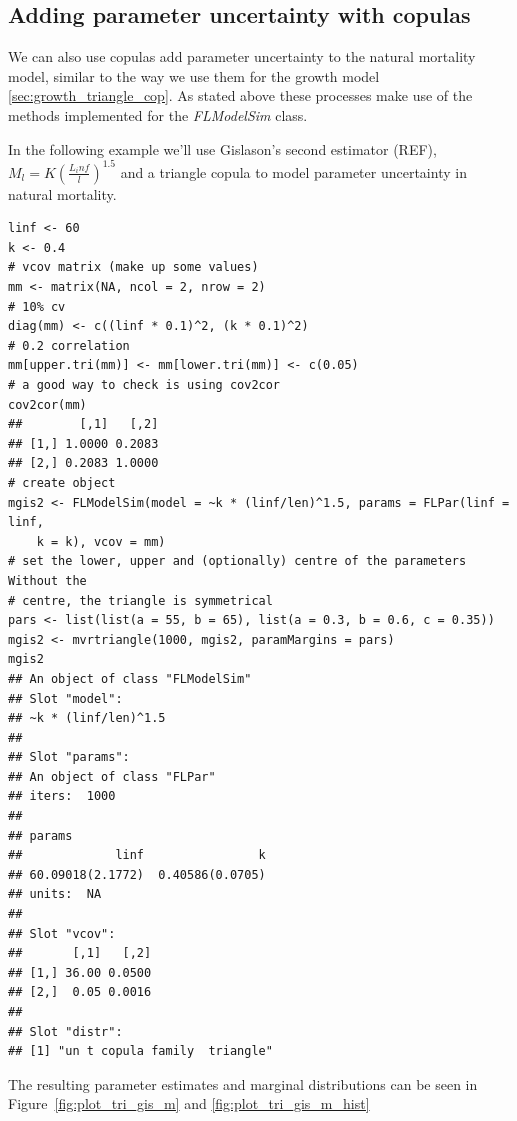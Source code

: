 \documentclass[a4paper,english,10pt]{article}\usepackage[]{graphicx}\usepackage[]{color}
\makeatletter
\newenvironment{kframe}{%
 \def\at@end@of@kframe{}%
 \ifinner\ifhmode%
  \def\at@end@of@kframe{\end{minipage}}%
  \begin{minipage}{\columnwidth}%
 \fi\fi%
 \def\FrameCommand##1{\hskip\@totalleftmargin \hskip-\fboxsep
 \colorbox{shadecolor}{##1}\hskip-\fboxsep
     \hskip-\linewidth \hskip-\@totalleftmargin \hskip\columnwidth}%
 \MakeFramed {\advance\hsize-\width
   \@totalleftmargin\z@ \linewidth\hsize
   \@setminipage}}%
 {\par\unskip\endMakeFramed%
 \at@end@of@kframe}
\newenvironment{knitrout}{}{} %
\newcommand{\class}[1]{{\textit{#1}}}
\makeatother
\begin{document}

\subsection{Adding parameter uncertainty with copulas}

We can also use copulas add parameter uncertainty to the natural mortality model, similar to the way we use them for the growth model \ref{sec:growth_triangle_cop}. As stated above these processes make use of the methods implemented for the \class{FLModelSim} class.


In the following example we'll use Gislason's second estimator (REF), $M_l=K(\frac{L_inf}{l})^1.5$ and a triangle copula to model parameter uncertainty in natural mortality.

\begin{knitrout}
\color{fgcolor}\begin{kframe}
\begin{verbatim}
linf <- 60
k <- 0.4
# vcov matrix (make up some values)
mm <- matrix(NA, ncol = 2, nrow = 2)
# 10% cv
diag(mm) <- c((linf * 0.1)^2, (k * 0.1)^2)
# 0.2 correlation
mm[upper.tri(mm)] <- mm[lower.tri(mm)] <- c(0.05)
# a good way to check is using cov2cor
cov2cor(mm)
##        [,1]   [,2]
## [1,] 1.0000 0.2083
## [2,] 0.2083 1.0000
# create object
mgis2 <- FLModelSim(model = ~k * (linf/len)^1.5, params = FLPar(linf = linf, 
    k = k), vcov = mm)
# set the lower, upper and (optionally) centre of the parameters Without the
# centre, the triangle is symmetrical
pars <- list(list(a = 55, b = 65), list(a = 0.3, b = 0.6, c = 0.35))
mgis2 <- mvrtriangle(1000, mgis2, paramMargins = pars)
mgis2
## An object of class "FLModelSim"
## Slot "model":
## ~k * (linf/len)^1.5
## 
## Slot "params":
## An object of class "FLPar"
## iters:  1000 
## 
## params
##             linf                k 
## 60.09018(2.1772)  0.40586(0.0705) 
## units:  NA 
## 
## Slot "vcov":
##       [,1]   [,2]
## [1,] 36.00 0.0500
## [2,]  0.05 0.0016
## 
## Slot "distr":
## [1] "un t copula family  triangle"
\end{verbatim}
\end{kframe}
\end{knitrout}


The resulting parameter estimates and marginal distributions can be seen in Figure~\ref{fig:plot_tri_gis_m} and \ref{fig:plot_tri_gis_m_hist}
\end{document}
